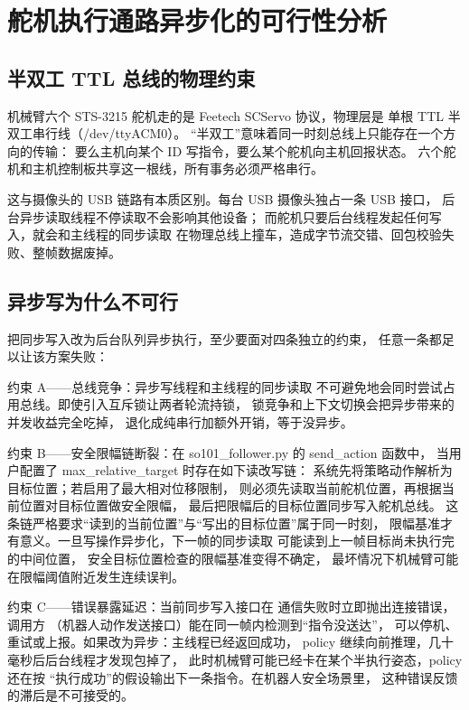\section{舵机执行通路异步化的可行性分析}\label{sec:async-write}

\subsection{半双工 TTL 总线的物理约束}\label{sec:async-write-bus}

机械臂六个 STS-3215 舵机走的是 Feetech SCServo 协议，物理层是
单根 TTL 半双工串行线（/dev/ttyACM0）。
``半双工''意味着同一时刻总线上只能存在一个方向的传输：
要么主机向某个 ID 写指令，要么某个舵机向主机回报状态。
六个舵机和主机控制板共享这一根线，所有事务必须严格串行。

这与摄像头的 USB 链路有本质区别。每台 USB 摄像头独占一条 USB 接口，
后台异步读取线程不停读取不会影响其他设备；
而舵机只要后台线程发起任何写入，就会和主线程的同步读取
在物理总线上撞车，造成字节流交错、回包校验失败、整帧数据废掉。

\subsection{异步写为什么不可行}\label{sec:async-write-why-not}

把同步写入改为后台队列异步执行，至少要面对四条独立的约束，
任意一条都足以让该方案失败：

约束 A——总线竞争：异步写线程和主线程的同步读取
不可避免地会同时尝试占用总线。即使引入互斥锁让两者轮流持锁，
锁竞争和上下文切换会把异步带来的并发收益完全吃掉，
退化成纯串行加额外开销，等于没异步。

约束 B——安全限幅链断裂：在
so101\_follower.py 的 send\_action 函数中，
当用户配置了 max\_relative\_target 时存在如下读改写链：
系统先将策略动作解析为目标位置；若启用了最大相对位移限制，
则必须先读取当前舵机位置，再根据当前位置对目标位置做安全限幅，
最后把限幅后的目标位置同步写入舵机总线。
这条链严格要求``读到的当前位置''与``写出的目标位置''属于同一时刻，
限幅基准才有意义。一旦写操作异步化，下一帧的同步读取
可能读到上一帧目标尚未执行完的中间位置，
安全目标位置检查的限幅基准变得不确定，
最坏情况下机械臂可能在限幅阈值附近发生连续误判。

约束 C——错误暴露延迟：当前同步写入接口在
通信失败时立即抛出连接错误，调用方
（机器人动作发送接口）能在同一帧内检测到``指令没送达''，
可以停机、重试或上报。如果改为异步：主线程已经返回成功，
policy 继续向前推理，几十毫秒后后台线程才发现包掉了，
此时机械臂可能已经卡在某个半执行姿态，policy 还在按
``执行成功''的假设输出下一条指令。在机器人安全场景里，
这种错误反馈的滞后是不可接受的。

